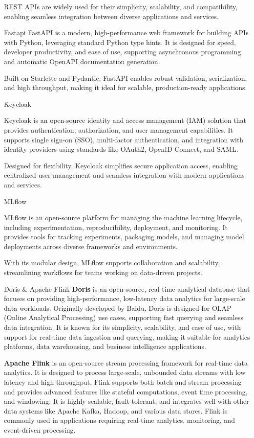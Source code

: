 REST APIs are widely used for their simplicity, scalability, and compatibility, enabling seamless integration between diverse applications and services.

\secc Fastapi
FastAPI is a modern, high-performance web framework for building APIs with Python, leveraging standard Python type hints. It is designed for speed, developer productivity, and ease of use, supporting asynchronous programming and automatic OpenAPI documentation generation.

Built on Starlette and Pydantic, FastAPI enables robust validation, serialization, and high throughput, making it ideal for scalable, production-ready applications.

\secc Keycloak

Keycloak is an open-source identity and access management (IAM) solution that provides authentication, authorization, and user management capabilities. It supports single sign-on (SSO), multi-factor authentication, and integration with identity providers using standards like OAuth2, OpenID Connect, and SAML.

Designed for flexibility, Keycloak simplifies secure application access, enabling centralized user management and seamless integration with modern applications and services.

\secc MLflow

MLflow is an open-source platform for managing the machine learning lifecycle, including experimentation, reproducibility, deployment, and monitoring. It provides tools for tracking experiments, packaging models, and managing model deployments across diverse frameworks and environments.

With its modular design, MLflow supports collaboration and scalability, streamlining workflows for teams working on data-driven projects.

\secc Doris \& Apache Flink
{\bf Doris} is an open-source, real-time analytical database that focuses on providing high-performance, low-latency data analytics for large-scale data workloads. Originally developed by Baidu, Doris is designed for OLAP (Online Analytical Processing) use cases, supporting fast querying and seamless data integration. It is known for its simplicity, scalability, and ease of use, with support for real-time data ingestion and querying, making it suitable for analytics platforms, data warehousing, and business intelligence applications.

{\bf Apache Flink} is an open-source stream processing framework for real-time data analytics. It is designed to process large-scale, unbounded data streams with low latency and high throughput. Flink supports both batch and stream processing and provides advanced features like stateful computations, event time processing, and windowing. It is highly scalable, fault-tolerant, and integrates well with other data systems like Apache Kafka, Hadoop, and various data stores. Flink is commonly used in applications requiring real-time analytics, monitoring, and event-driven processing.